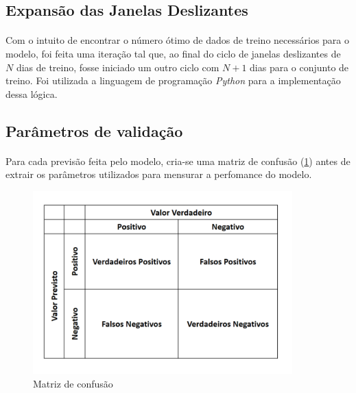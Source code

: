 \documentclass[grad,numbers]{coppe}
\begin{document}
            \subsection{Expansão das Janelas Deslizantes}
            
                \paragraph{}Com o intuito de encontrar o número ótimo de dados de treino necessários para o modelo, foi feita uma iteração tal que, ao final do ciclo de janelas deslizantes de $N$ dias de treino, fosse iniciado um outro ciclo com $N+1$ dias para o conjunto de treino. Foi utilizada a linguagem de programação \textit{Python} para a implementação dessa lógica.
                
            \subsection{Parâmetros de validação}
            
                \paragraph{}Para cada previsão feita pelo modelo, cria-se uma matriz de confusão (\ref{img:matriz-confusao}) antes de extrair os parâmetros utilizados para mensurar a perfomance do modelo. 
                
                \begin{figure}[h]
                    \caption{Matriz de confusão}
                    \label{img:matriz-confusao}
                    \includegraphics[width=10cm]{matrix-confusao.png}
                    \centering
                \end{figure}
                
\end{document}
